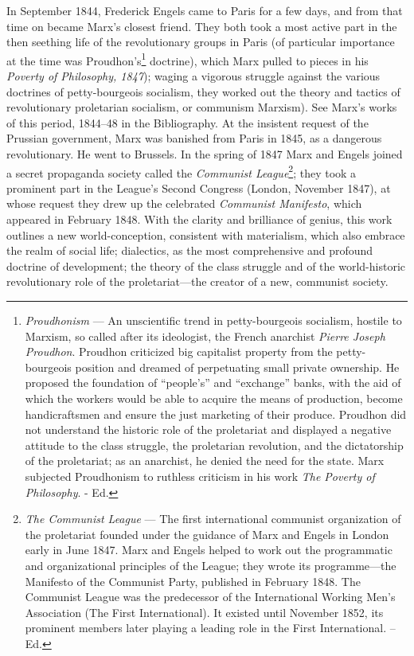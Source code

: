 \documentclass[a4paper,12pt]{book}
\begin{document}
 In September 1844, Frederick Engels came to Paris for a few days, and from that time on became Marx’s closest friend. They both took a most active part in the then seething life of the revolutionary groups in Paris (of particular importance at the time was Proudhon’s\footnote{\textit{Proudhonism} — An unscientific trend in petty-bourgeois socialism, hostile to Marxism, so called after its ideologist, the French anarchist \emph{Pierre Joseph Proudhon}. Proudhon criticized big capitalist property from the petty-bourgeois position and dreamed of perpetuating small private ownership. He proposed the foundation of “people’s” and “exchange” banks, with the aid of which the workers would be able to acquire the means of production, become handicraftsmen and ensure the just marketing of their produce. Proudhon did not understand the historic role of the proletariat and displayed a negative attitude to the class struggle, the proletarian revolution, and the dictatorship of the proletariat; as an anarchist, he denied the need for the state. Marx subjected Proudhonism to ruthless criticism in his work \emph{The Poverty of Philosophy}. - Ed.} doctrine), which Marx pulled to pieces in his \emph{Poverty of Philosophy, 1847}); waging a vigorous struggle against the various doctrines of petty-bourgeois socialism, they worked out the theory and tactics of revolutionary proletarian socialism, or communism Marxism). See Marx’s works of this period, 1844--48 in the Bibliography. At the insistent request of the Prussian government, Marx was banished from Paris in 1845, as a dangerous revolutionary. He went to Brussels. In the spring of 1847 Marx and Engels joined a secret propaganda society called the \emph{Communist League}\footnote{\emph{The Communist League} — The first international communist organization of the proletariat founded under the guidance of Marx and Engels in London early in June 1847. Marx and Engels helped to work out the programmatic and organizational principles of the League; they wrote its programme—the Manifesto of the Communist Party, published in February 1848. The Communist League was the predecessor of the International Working Men’s Association (The First International). It existed until November 1852, its prominent members later playing a leading role in the First International. -- Ed.}; they took a prominent part in the League’s Second Congress (London, November 1847), at whose request they drew up the celebrated \emph{Communist Manifesto}, which appeared in February 1848. With the clarity and brilliance of genius, this work outlines a new world-conception, consistent with materialism, which also embrace the realm of social life; dialectics, as the most comprehensive and profound doctrine of development; the theory of the class struggle and of the world-historic revolutionary role of the proletariat—the creator of a new, communist society.
\end{document}
